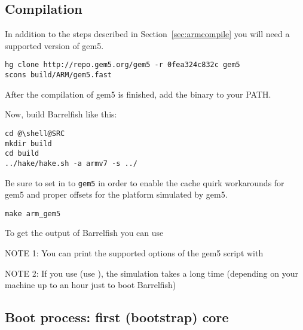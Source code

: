 \documentclass[a4paper,twoside]{report} %
\begin{document}
\subsection{Compilation}


In addition to the steps described in Section~\ref{sec:armcompile} you
will need a supported version of gem5.

\begin{lstlisting}
hg clone http://repo.gem5.org/gem5 -r 0fea324c832c gem5
scons build/ARM/gem5.fast
\end{lstlisting}
After the compilation of gem5 is finished, add the binary to your PATH.

Now, build Barrelfish like this:
\begin{lstlisting}
cd @\shell@SRC
mkdir build
cd build
../hake/hake.sh -a armv7 -s ../
\end{lstlisting}

Be sure to set  in
 to \texttt{gem5} in order to enable
the cache quirk workarounds for gem5 and proper offsets for the
platform simulated by gem5.

\begin{lstlisting}
make arm_gem5
\end{lstlisting}

To get the output of Barrelfish you can use 

NOTE 1: You can print the supported options of the gem5 script with

NOTE 2: If you use  (use ), the simulation takes a long time (depending on
your machine up to an hour just to boot Barrelfish)


\subsection{Boot process: first (bootstrap) core}

\end{document}
